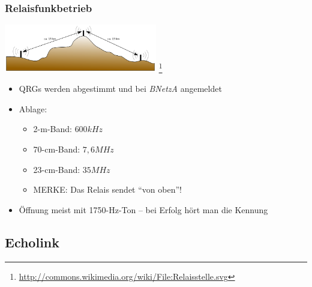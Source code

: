 \begin{frame}
    \frametitle{Relaisfunkbetrieb}

    \begin{center}
        \includegraphics[width=0.5\textwidth,height=.35\textheight,keepaspectratio]{bv11/Relaisstelle.png}
        \footnote{\tiny \url{http://commons.wikimedia.org/wiki/File:Relaisstelle.svg}}
    \end{center}

    \begin{itemize}
        \item QRGs werden abgestimmt und bei \emph{BNetzA} angemeldet
        \item Ablage:
        \begin{itemize}
            \item 2-m-Band: $600 kHz$
            \item 70-cm-Band: $7,6 MHz$
            \item 23-cm-Band: $35 MHz$
            \item MERKE: Das Relais sendet ``von oben''!
        \end{itemize}
        \item Öffnung meist mit 1750-Hz-Ton -- bei Erfolg hört man die Kennung
    \end{itemize}

\end{frame}

\subsection{Echolink}

